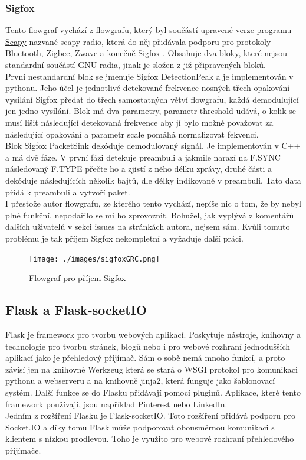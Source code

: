 \documentclass{ctuthesis}
\begin{document}
\subsubsection{Sigfox}
Tento flowgraf vychází z flowgrafu, který byl součástí upravené verze programu \href{https://scapy.net}{Scapy} nazvané scapy-radio, která do něj přidávala podporu pro protokoly Bluetooth, Zigbee, Zwave a konečně Sigfox \cite{cybertools2016}. Obsahuje dva bloky, které nejsou standardní součástí GNU radia, jinak je složen z již připravených bloků.\\
První nestandardní blok se jmenuje Sigfox DetectionPeak a je implementován v pythonu. Jeho účel je jednotlivé detekované frekvence nosných třech opakování vysílání Sigfox předat do třech samostatných větví flowgrafu, každá demodulující jen jedno vysílání. Blok má dva parametry, parametr threshold udává, o kolik se musí lišit následující detekovaná frekvence aby jí bylo možné považovat za následující opakování a parametr scale pomáhá normalizovat fekvenci.\\
Blok Sigfox PacketSink dekóduje demodulovaný signál. Je implementován v C++ a má dvě fáze. V první fázi detekuje preambuli a jakmile narazí na F.SYNC následovaný F.TYPE přečte ho a zjistí z něho délku zprávy, druhé části a dekóduje následujících několik bajtů, dle délky indikované v preambuli. Tato data přidá k preambuli a vytvoří paket.\\
I přestože autor flowgrafu, ze kterého tento vychází, nepíše nic o tom, že by nebyl plně funkční, nepodařilo se mi ho zprovoznit. Bohužel, jak vyplývá z komentářů dalších uživatelů v sekci issues na stránkách autora, nejsem sám. Kvůli tomuto problému je tak příjem Sigfox nekompletní a vyžaduje další práci.
\begin{figure}
\caption{Flowgraf pro příjem Sigfox}
\texttt{[image: ./images/sigfoxGRC.png]}
\label{sigfoxGRC}
\end{figure}

\subsection{Flask a Flask-socketIO}
Flask je framework pro tvorbu webových aplikací. Poskytuje nástroje, knihovny a technologie pro tvorbu stránek, blogů nebo i pro webové rozhraní jednodušších aplikací jako je přehledový přijímač. Sám o sobě nemá mnoho funkcí, a proto závisí jen na knihovně Werkzeug která se stará o WSGI protokol pro komunikaci pythonu a webserveru a na knihovně jinja2, která funguje jako šablonovací systém. Další funkce se do Flasku přidávají pomocí pluginů. Aplikace, které tento framework používají, jsou například Pinterest nebo LinkedIn. \cite{flaskwiki} \\
Jedním z rozšíření Flasku je Flask-socketIO. Toto rozšíření přidává podporu pro Socket.IO a díky tomu Flask může podporovat obousměrnou komunikaci s klientem s nízkou prodlevou. Toho je využito pro webové rozhraní přehledového přijímače.
\end{document}

